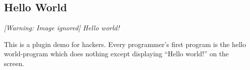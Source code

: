 \subsection{Hello World}
{\centering\itshape
  [Warning: Image ignored] %
 \newline
Hello world!
\par}

This is a plugin demo for hackers. Every programmer's
first program is the hello world{}-program
which does nothing except displaying ``Hello
world!'' on the screen.


